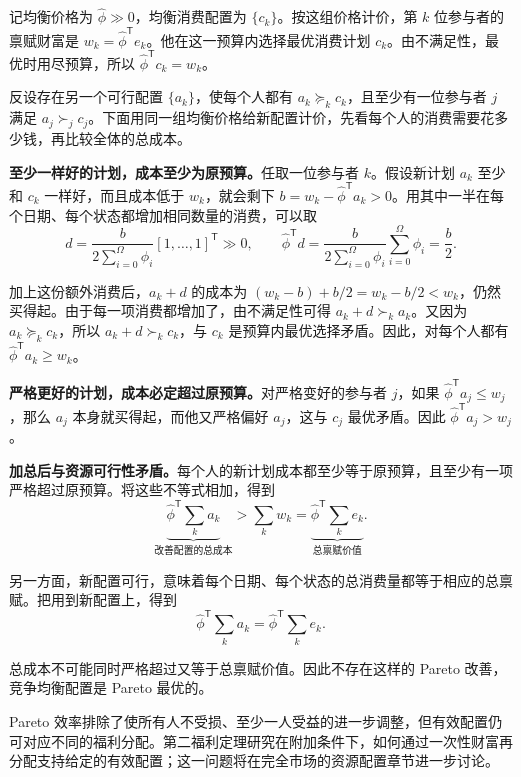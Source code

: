 \begin{solution}[label-content={证明},blank-type=none]
记均衡价格为 $\hat\phi\gg0$，均衡消费配置为 $\{c_k\}$。按这组价格计价，第 $k$ 位参与者的禀赋财富是 $w_k=\hat\phi^{\mathsf T}e_k$。他在这一预算内选择最优消费计划 $c_k$。由不满足性，最优时用尽预算，所以 $\hat\phi^{\mathsf T}c_k=w_k$。

反设存在另一个可行配置 $\{a_k\}$，使每个人都有 $a_k\succeq_k c_k$，且至少有一位参与者 $j$ 满足 $a_j\succ_j c_j$。下面用同一组均衡价格给新配置计价，先看每个人的消费需要花多少钱，再比较全体的总成本。

\textbf{至少一样好的计划，成本至少为原预算。}任取一位参与者 $k$。假设新计划 $a_k$ 至少和 $c_k$ 一样好，而且成本低于 $w_k$，就会剩下 $b=w_k-\hat\phi^{\mathsf T}a_k>0$。用其中一半在每个日期、每个状态都增加相同数量的消费，可以取
\[
 d=\frac{b}{2\sum_{i=0}^{\Omega}\phi_i}[1,\ldots,1]^{\mathsf T}\gg0,
 \qquad
 \hat\phi^{\mathsf T}d
 =\frac{b}{2\sum_{i=0}^{\Omega}\phi_i}\sum_{i=0}^{\Omega}\phi_i
 =\frac b2.
\]

加上这份额外消费后，$a_k+d$ 的成本为 $(w_k-b)+b/2=w_k-b/2<w_k$，仍然买得起。由于每一项消费都增加了，由不满足性可得 $a_k+d\succ_k a_k$。又因为 $a_k\succeq_k c_k$，所以 $a_k+d\succ_k c_k$，与 $c_k$ 是预算内最优选择矛盾。因此，对每个人都有 $\hat\phi^{\mathsf T}a_k\ge w_k$。

\textbf{严格更好的计划，成本必定超过原预算。}对严格变好的参与者 $j$，如果 $\hat\phi^{\mathsf T}a_j\le w_j$，那么 $a_j$ 本身就买得起，而他又严格偏好 $a_j$，这与 $c_j$ 最优矛盾。因此 $\hat\phi^{\mathsf T}a_j>w_j$。

\textbf{加总后与资源可行性矛盾。}每个人的新计划成本都至少等于原预算，且至少有一项严格超过原预算。将这些不等式相加，得到
\[
 \underbrace{\hat\phi^{\mathsf T}\sum_k a_k}_{\text{改善配置的总成本}}
 >\sum_k w_k
 =\underbrace{\hat\phi^{\mathsf T}\sum_k e_k}_{\text{总禀赋价值}}.
\]

另一方面，新配置可行，意味着每个日期、每个状态的总消费量都等于相应的总禀赋。把用到新配置上，得到
\[
 \hat\phi^{\mathsf T}\sum_k a_k=\hat\phi^{\mathsf T}\sum_k e_k.
\]

总成本不可能同时严格超过又等于总禀赋价值。因此不存在这样的 Pareto 改善，竞争均衡配置是 Pareto 最优的。
\end{solution}

\begin{tcolorbox}[knowledge,title=效率与分配]
Pareto 效率排除了使所有人不受损、至少一人受益的进一步调整，但有效配置仍可对应不同的福利分配。第二福利定理研究在附加条件下，如何通过一次性财富再分配支持给定的有效配置；这一问题将在完全市场的资源配置章节进一步讨论。
\end{tcolorbox}

